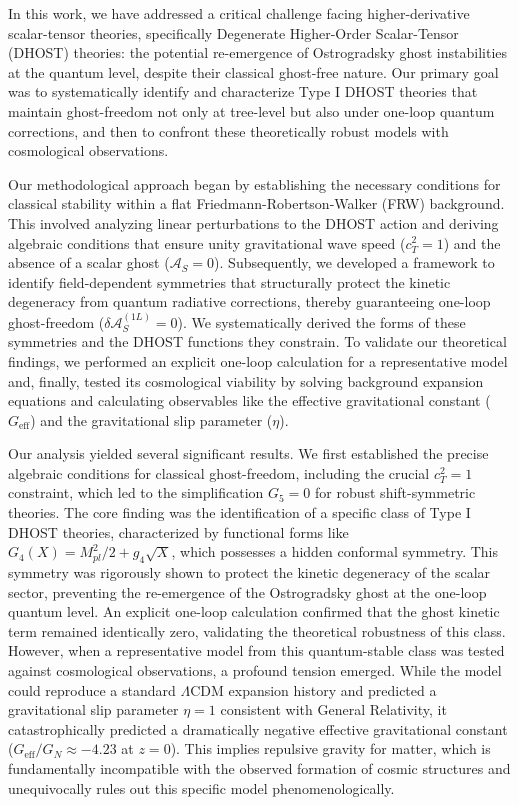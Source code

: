 \documentclass[twocolumn]{aastex631}
\begin{document}
In this work, we have addressed a critical challenge facing higher-derivative scalar-tensor theories, specifically Degenerate Higher-Order Scalar-Tensor (DHOST) theories: the potential re-emergence of Ostrogradsky ghost instabilities at the quantum level, despite their classical ghost-free nature. Our primary goal was to systematically identify and characterize Type I DHOST theories that maintain ghost-freedom not only at tree-level but also under one-loop quantum corrections, and then to confront these theoretically robust models with cosmological observations.

Our methodological approach began by establishing the necessary conditions for classical stability within a flat Friedmann-Robertson-Walker (FRW) background. This involved analyzing linear perturbations to the DHOST action and deriving algebraic conditions that ensure unity gravitational wave speed ($c_T^2=1$) and the absence of a scalar ghost ($\mathcal{A}_S=0$). Subsequently, we developed a framework to identify field-dependent symmetries that structurally protect the kinetic degeneracy from quantum radiative corrections, thereby guaranteeing one-loop ghost-freedom ($\delta\mathcal{A}_S^{(1L)}=0$). We systematically derived the forms of these symmetries and the DHOST functions they constrain. To validate our theoretical findings, we performed an explicit one-loop calculation for a representative model and, finally, tested its cosmological viability by solving background expansion equations and calculating observables like the effective gravitational constant ($G_{\text{eff}}$) and the gravitational slip parameter ($\eta$).

Our analysis yielded several significant results. We first established the precise algebraic conditions for classical ghost-freedom, including the crucial $c_T^2=1$ constraint, which led to the simplification $G_5=0$ for robust shift-symmetric theories. The core finding was the identification of a specific class of Type I DHOST theories, characterized by functional forms like $G_4(X) = M_{pl}^2/2 + g_4 \sqrt{X}$, which possesses a hidden conformal symmetry. This symmetry was rigorously shown to protect the kinetic degeneracy of the scalar sector, preventing the re-emergence of the Ostrogradsky ghost at the one-loop quantum level. An explicit one-loop calculation confirmed that the ghost kinetic term remained identically zero, validating the theoretical robustness of this class. However, when a representative model from this quantum-stable class was tested against cosmological observations, a profound tension emerged. While the model could reproduce a standard $\Lambda$CDM expansion history and predicted a gravitational slip parameter $\eta=1$ consistent with General Relativity, it catastrophically predicted a dramatically negative effective gravitational constant ($G_{\text{eff}}/G_N \approx -4.23$ at $z=0$). This implies repulsive gravity for matter, which is fundamentally incompatible with the observed formation of cosmic structures and unequivocally rules out this specific model phenomenologically.
\end{document}
